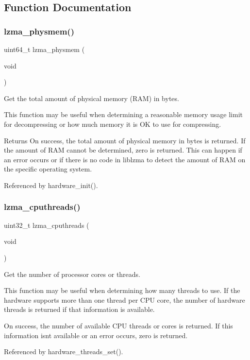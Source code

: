 \subsection{Function Documentation}
\mbox{\label{liblzma_2api_2lzma_2hardware_8h_a85363e453b34272a9f26c9fdffb041ee}} 
\subsubsection{lzma\+\_\+physmem()}
{\footnotesize\ttfamily uint64\+\_\+t lzma\+\_\+physmem (\begin{DoxyParamCaption}\item[{void}]{ }\end{DoxyParamCaption})}



Get the total amount of physical memory (R\+AM) in bytes. 

This function may be useful when determining a reasonable memory usage limit for decompressing or how much memory it is OK to use for compressing.

\begin{DoxyReturn}{Returns}
On success, the total amount of physical memory in bytes is returned. If the amount of R\+AM cannot be determined, zero is returned. This can happen if an error occurs or if there is no code in liblzma to detect the amount of R\+AM on the specific operating system. 
\end{DoxyReturn}


Referenced by hardware\+\_\+init().

\mbox{\label{liblzma_2api_2lzma_2hardware_8h_a22f7a882b7a4b741a226abf62bdf46ca}} 
\subsubsection{lzma\+\_\+cputhreads()}
{\footnotesize\ttfamily uint32\+\_\+t lzma\+\_\+cputhreads (\begin{DoxyParamCaption}\item[{void}]{ }\end{DoxyParamCaption})}



Get the number of processor cores or threads. 

This function may be useful when determining how many threads to use. If the hardware supports more than one thread per C\+PU core, the number of hardware threads is returned if that information is available.

On success, the number of available C\+PU threads or cores is returned. If this information isn\textquotesingle{}t available or an error occurs, zero is returned. 

Referenced by hardware\+\_\+threads\+\_\+set().

